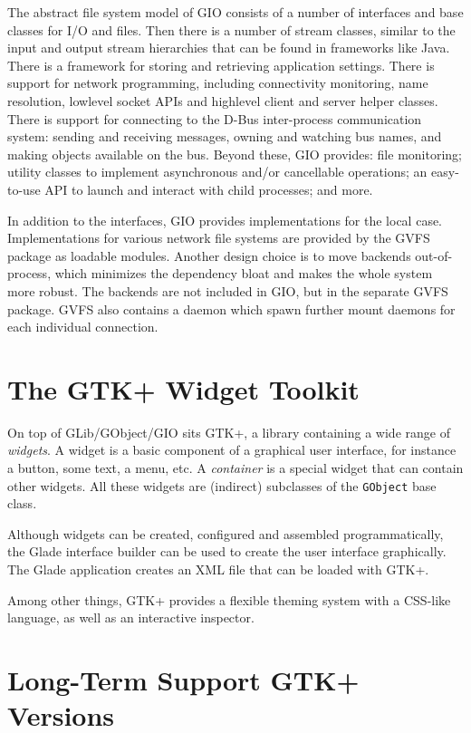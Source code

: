 \documentclass[a4paper,notumble]{leaflet}
\begin{document}
The abstract file system model of GIO consists of a number of interfaces and base classes for I/O and files. Then there is a number of stream classes, similar to the input and output stream hierarchies that can be found in frameworks like Java. There is a framework for storing and retrieving application settings. There is support for network programming, including connectivity monitoring, name resolution, lowlevel socket APIs and highlevel client and server helper classes. There is support for connecting to the D-Bus inter-process communication system: sending and receiving messages, owning and watching bus names, and making objects available on the bus. Beyond these, GIO provides: file monitoring; utility classes to implement asynchronous and/or cancellable operations; an easy-to-use API to launch and interact with child processes; and more.

In addition to the interfaces, GIO provides implementations for the local case. Implementations for various network file systems are provided by the GVFS package as loadable modules. Another design choice is to move backends out-of-process, which minimizes the dependency bloat and makes the whole system more robust. The backends are not included in GIO, but in the separate GVFS package. GVFS also contains a daemon which spawn further mount daemons for each individual connection.

\pagebreak
\section{The GTK+ Widget Toolkit}

On top of GLib/GObject/GIO sits GTK+, a library containing a wide range of \textit{widgets}. A widget is a basic component of a graphical user interface, for instance a button, some text, a menu, etc. A \textit{container} is a special widget that can contain other widgets. All these widgets are (indirect) subclasses of the \texttt{GObject} base class.

Although widgets can be created, configured and assembled programmatically, the Glade interface builder can be used to create the user interface graphically. The Glade application creates an XML file that can be loaded with GTK+.

Among other things, GTK+ provides a flexible theming system with a CSS-like language, as well as an interactive inspector.

\section{Long-Term Support GTK+ Versions}
\end{document}
